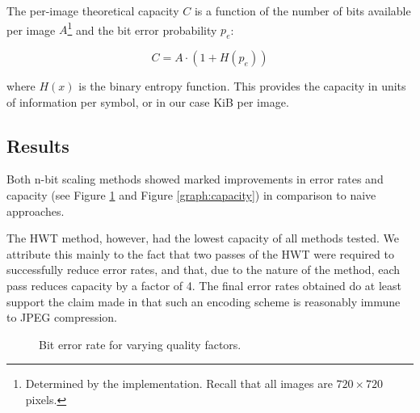 The per-image theoretical capacity $C$ is a function of the number of bits available per image $A$\footnote{Determined by the implementation. Recall that all images are $720 \times 720$ pixels.} and the bit error probability $p_e$:

\begin{equation}
    C = A \cdot (1 + H(p_e))
\end{equation}

where $H(x)$ is the binary entropy function. This provides the capacity in units of information per symbol, or in our case KiB per image.

\subsection{Results}
\label{cap:cap:res}

Both n-bit scaling methods showed marked improvements in error rates and capacity (see Figure \ref{graph:ber} and Figure \ref{graph:capacity}) in comparison to naive approaches.

The HWT method, however, had the lowest capacity of all methods tested. We attribute this mainly to the fact that two passes of the HWT were required to successfully reduce error rates, and that, due to the nature of the method, each pass reduces capacity by a factor of 4. The final error rates obtained do at least support the claim made in \cite{haar} that such an encoding scheme is reasonably immune to JPEG compression.


\begin{figure}[tbph]
  \begin{center}
    \caption{Bit error rate for varying quality factors.}
    \label{graph:ber}
  \end{center}
\end{figure}

